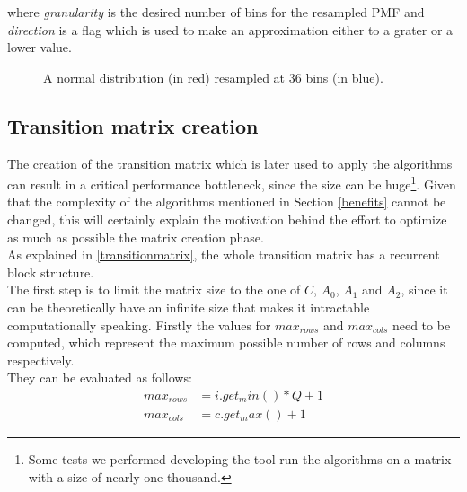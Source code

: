 where \emph{granularity} is the desired number of bins for the resampled PMF and \emph{direction} is a flag which is used to make an approximation either to a grater or a lower value.\\
\begin{figure}[H]
  \caption{A normal distribution (in red) resampled at 36 bins (in blue).}
  \label{resample}
\end{figure}

\subsection{Transition matrix creation}
The creation of the transition matrix which is later used to apply the algorithms can result in a critical performance bottleneck, since the size can be huge\footnote{Some tests we performed developing the tool run the algorithms on a matrix with a size of nearly one thousand.}. Given that the complexity of the algorithms mentioned in Section \ref{benefits} cannot be changed, this will certainly explain the motivation behind the effort to optimize as much as possible the matrix creation phase.\\
As explained in \ref{transitionmatrix}, the whole transition matrix has a recurrent block structure.\\ 
The first step is to limit the matrix size to the one of \( C \), \( A_{0} \), \( A_{1} \) and \( A_{2} \), since it can be theoretically have an infinite size that makes it intractable computationally speaking. Firstly the values for \( max_{rows} \) and \( max_{cols} \) need to be computed, which represent the maximum possible number of rows and columns respectively.\\ 
They can be evaluated as follows: 
\begin{equation*}
\begin{split}
  max_{rows} &= i.get_min() * Q + 1 \\
  max_{cols} &= c.get_max() + 1
\end{split}
\end{equation*}


